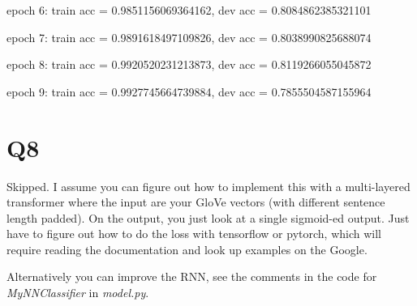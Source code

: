 \documentclass[11pt]{article}
\begin{document}
epoch 6: train acc = 0.9851156069364162, dev acc = 0.8084862385321101

epoch 7: train acc = 0.9891618497109826, dev acc = 0.8038990825688074

epoch 8: train acc = 0.9920520231213873, dev acc = 0.8119266055045872

epoch 9: train acc = 0.9927745664739884, dev acc = 0.7855504587155964

\section*{Q8}

Skipped. I assume you can figure out how to implement this with a multi-layered transformer where the input are your GloVe vectors (with different sentence length padded). On the output, you just
look at a single sigmoid-ed output. Just have to figure out how to do the loss with tensorflow or pytorch, which will require reading the documentation and look up examples on the Google.

Alternatively you can improve the RNN, see the comments in the code for \textit{MyNNClassifier} in \textit{model.py}.



\end{document}
